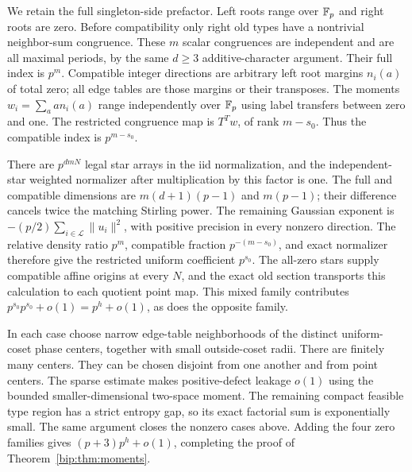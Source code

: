 We retain the full singleton-side prefactor. Left roots range over
$\mathbb F_p$ and right roots are zero. Before compatibility only right
old types have a nontrivial neighbor-sum congruence. These $m$
scalar congruences are independent and are all maximal periods,
by the same $d\ge3$ additive-character argument. Their full index
is $p^m$. Compatible integer directions are arbitrary left root
margins $n_i(a)$ of total zero; all edge tables are those margins
or their transposes. The moments $w_i=\sum_a a n_i(a)$ range
independently over $\mathbb F_p$ using label transfers between zero and
one. The restricted congruence map is $T^Tw$, of rank $m-s_0$.
Thus the compatible index is $p^{m-s_0}$.

There are $p^{dmN}$ legal star arrays in the iid normalization,
and the independent-star weighted normalizer after multiplication
by this factor is one. The full and compatible dimensions are
$m(d+1)(p-1)$ and $m(p-1)$; their difference cancels twice the
matching Stirling power. The remaining Gaussian exponent is
$-(p/2)\sum_{i\in\mathcal L}\|u_i\|^2$, with positive precision in every
nonzero direction. The relative density ratio $p^m$, compatible
fraction $p^{-(m-s_0)}$, and exact normalizer therefore give the
restricted uniform coefficient $p^{s_0}$.
The all-zero stars supply compatible affine origins at every $N$,
and the exact old section transports this calculation to each
quotient point map. This mixed family contributes
$p^{s_0}p^{s_0}+o(1)=p^h+o(1)$, as does the opposite family.

In each case choose narrow edge-table neighborhoods of the distinct
uniform-coset phase centers, together with small outside-coset radii.
There are finitely many centers. They can be chosen disjoint from
one another and from point centers. The sparse estimate makes
positive-defect leakage $o(1)$ using the bounded smaller-dimensional
two-space moment. The remaining compact feasible type region has
a strict entropy gap, so its exact factorial sum is exponentially
small. The same argument closes the nonzero cases above.
Adding the four zero families gives $(p+3)p^h+o(1)$, completing
the proof of Theorem~\ref{bip:thm:moments}.

